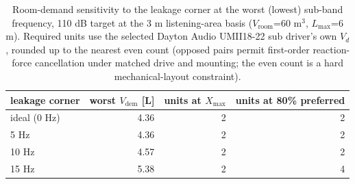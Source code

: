 \begin{table}[htbp]
\centering
\caption{Room-demand sensitivity to the leakage corner at the worst (lowest) sub-band frequency, 110 dB target at the 3 m listening-area basis ($V_{\mathrm{room}}$=60 m$^3$, $L_{\max}$=6 m). Required units use the selected Dayton Audio UMII18-22 sub driver's own $V_d$, rounded up to the nearest even count (opposed pairs permit first-order reaction-force cancellation under matched drive and mounting; the even count is a hard mechanical-layout constraint).}
\label{tab:room-sensitivity}
\begin{tabular}{lrrr}
\toprule
leakage corner & worst $V_{\mathrm{dem}}$ [L] & units at $X_{\max}$ & units at 80\% preferred\\
\midrule
ideal (0 Hz) & 4.36 & 2 & 2\\
5 Hz & 4.36 & 2 & 2\\
10 Hz & 4.57 & 2 & 2\\
15 Hz & 5.38 & 2 & 4\\
\bottomrule
\end{tabular}
\end{table}
